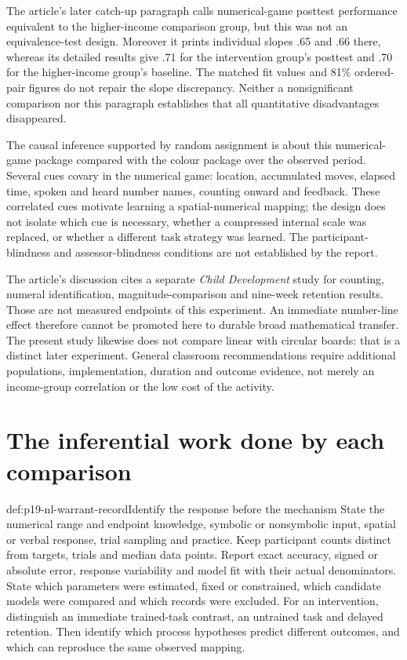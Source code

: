 The article's later catch-up paragraph calls numerical-game
posttest performance equivalent to the higher-income comparison
group, but this was not an equivalence-test design. Moreover it
prints individual slopes .65 and .66 there, whereas its detailed
results give .71 for the intervention group's posttest and .70
for the higher-income group's baseline. The matched fit values
and 81\% ordered-pair figures do not repair the slope discrepancy.
Neither a nonsignificant comparison nor this paragraph establishes
that all quantitative disadvantages disappeared.

The causal inference supported by random assignment is about
this numerical-game package compared with the colour package
over the observed period. Several cues covary in the numerical
game: location, accumulated moves, elapsed time, spoken and heard
number names, counting onward and feedback. These correlated
cues motivate learning a spatial-numerical mapping; the design
does not isolate which cue is necessary, whether a compressed
internal scale was replaced, or whether a different task strategy
was learned. The participant-blindness and assessor-blindness
conditions are not established by the report.

The article's discussion cites a separate \emph{Child Development}
study for counting, numeral identification, magnitude-comparison
and nine-week retention results. Those are not measured endpoints
of this experiment. An immediate number-line effect therefore
cannot be promoted here to durable broad mathematical transfer.
The present study likewise does not compare linear with circular
boards: that is a distinct later experiment. General classroom
recommendations require additional populations, implementation,
duration and outcome evidence, not merely an income-group
correlation or the low cost of the activity.

\section{The inferential work done by each comparison}
\label{sec:p19-nl-warrants}

\begin{hbmethod}{def:p19-nl-warrant-record}{Identify the response before the mechanism}
State the numerical range and endpoint knowledge, symbolic or
nonsymbolic input, spatial or verbal response, trial sampling and
practice. Keep participant counts distinct from targets, trials
and median data points. Report exact accuracy, signed or absolute
error, response variability and model fit with their actual
denominators. State which parameters were estimated, fixed or
constrained, which candidate models were compared and which records
were excluded. For an intervention, distinguish an immediate
trained-task contrast, an untrained task and delayed retention.
Then identify which process hypotheses predict different outcomes,
and which can reproduce the same observed mapping.
\end{hbmethod}

